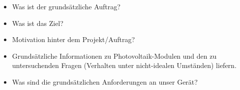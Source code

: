 \begin{itemize}
    \item
        Was ist der grunds\"atzliche Auftrag?
    \item
        Was ist das Ziel?
    \item
        Motivation hinter dem Projekt/Auftrag?
    \item
        Grunds\"atzliche  Informationen  zu  Photovoltaik-Modulen und  den  zu
        untersuchenden  Fragen  (Verhalten  unter  nicht-idealen  Umst\"anden)
        liefern.
    \item
        Was sind die grunds\"atzlichen Anforderungen an unser Ger\"at?
\end{itemize}
